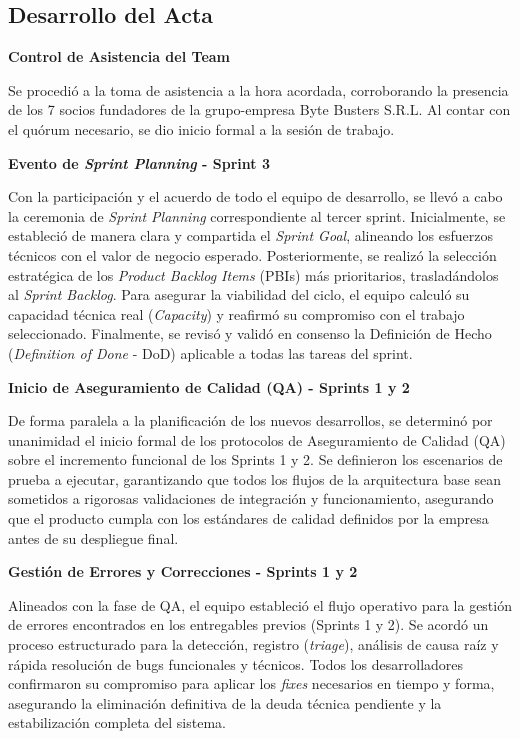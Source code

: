 \newpage
\subsection{Desarrollo del Acta}

\noindent \textbf{Control de Asistencia del Team}\par
Se procedió a la toma de asistencia a la hora acordada, corroborando la presencia de los 7 socios fundadores de la grupo-empresa Byte Busters S.R.L. Al contar con el quórum necesario, se dio inicio formal a la sesión de trabajo.

\vspace*{0.5cm}
\noindent \textbf{Evento de \textit{Sprint Planning} - Sprint 3}\par
Con la participación y el acuerdo de todo el equipo de desarrollo, se llevó a cabo la ceremonia de \textit{Sprint Planning} correspondiente al tercer sprint. Inicialmente, se estableció de manera clara y compartida el \textit{Sprint Goal}, alineando los esfuerzos técnicos con el valor de negocio esperado. Posteriormente, se realizó la selección estratégica de los \textit{Product Backlog Items} (PBIs) más prioritarios, trasladándolos al \textit{Sprint Backlog}. Para asegurar la viabilidad del ciclo, el equipo calculó su capacidad técnica real (\textit{Capacity}) y reafirmó su compromiso con el trabajo seleccionado. Finalmente, se revisó y validó en consenso la Definición de Hecho (\textit{Definition of Done} - DoD) aplicable a todas las tareas del sprint.

\vspace*{0.5cm}
\noindent \textbf{Inicio de Aseguramiento de Calidad (QA) - Sprints 1 y 2}\par
De forma paralela a la planificación de los nuevos desarrollos, se determinó por unanimidad el inicio formal de los protocolos de Aseguramiento de Calidad (QA) sobre el incremento funcional de los Sprints 1 y 2. Se definieron los escenarios de prueba a ejecutar, garantizando que todos los flujos de la arquitectura base sean sometidos a rigorosas validaciones de integración y funcionamiento, asegurando que el producto cumpla con los estándares de calidad definidos por la empresa antes de su despliegue final.

\vspace*{0.5cm}
\noindent \textbf{Gestión de Errores y Correcciones - Sprints 1 y 2}\par
Alineados con la fase de QA, el equipo estableció el flujo operativo para la gestión de errores encontrados en los entregables previos (Sprints 1 y 2). Se acordó un proceso estructurado para la detección, registro (\textit{triage}), análisis de causa raíz y rápida resolución de bugs funcionales y técnicos. Todos los desarrolladores confirmaron su compromiso para aplicar los \textit{fixes} necesarios en tiempo y forma, asegurando la eliminación definitiva de la deuda técnica pendiente y la estabilización completa del sistema.

